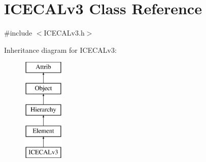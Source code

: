 \hypertarget{classICECALv3}{}\section{I\+C\+E\+C\+A\+Lv3 Class Reference}
\label{classICECALv3}


{\ttfamily \#include $<$I\+C\+E\+C\+A\+Lv3.\+h$>$}

Inheritance diagram for I\+C\+E\+C\+A\+Lv3\+:\begin{figure}[H]
\begin{center}
\leavevmode
\includegraphics[height=5.000000cm]{classICECALv3}
\end{center}
\end{figure}
